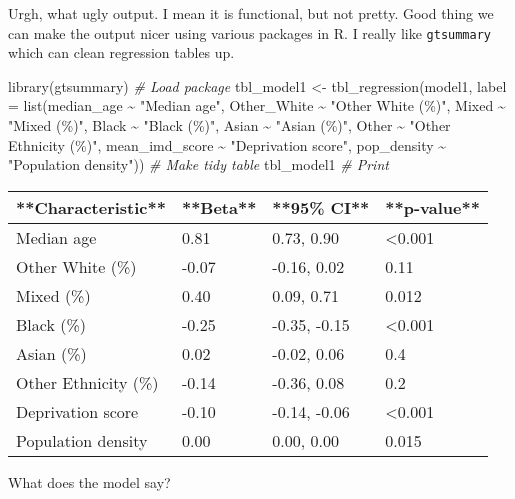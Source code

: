 \documentclass[
]{book}
\newenvironment{Shaded}{\begin{snugshade}}{\end{snugshade}}
\newcommand{\AttributeTok}[1]{\textcolor[rgb]{0.77,0.63,0.00}{#1}}
\newcommand{\CommentTok}[1]{\textcolor[rgb]{0.56,0.35,0.01}{\textit{#1}}}
\newcommand{\FunctionTok}[1]{\textcolor[rgb]{0.00,0.00,0.00}{#1}}
\newcommand{\NormalTok}[1]{#1}
\newcommand{\OtherTok}[1]{\textcolor[rgb]{0.56,0.35,0.01}{#1}}
\newcommand{\SpecialCharTok}[1]{\textcolor[rgb]{0.00,0.00,0.00}{#1}}
\newcommand{\StringTok}[1]{\textcolor[rgb]{0.31,0.60,0.02}{#1}}
\begin{document}
Urgh, what ugly output. I mean it is functional, but not pretty. Good thing we can make the output nicer using various packages in R. I really like \texttt{gtsummary} which can clean regression tables up.

\begin{Shaded}
\begin{Highlighting}[]
\FunctionTok{library}\NormalTok{(gtsummary) }\CommentTok{\# Load package}
\NormalTok{tbl\_model1 }\OtherTok{\textless{}{-}} \FunctionTok{tbl\_regression}\NormalTok{(model1, }\AttributeTok{label =} \FunctionTok{list}\NormalTok{(median\_age }\SpecialCharTok{\textasciitilde{}} \StringTok{"Median age"}\NormalTok{, Other\_White }\SpecialCharTok{\textasciitilde{}} \StringTok{"Other White (\%)"}\NormalTok{, Mixed }\SpecialCharTok{\textasciitilde{}} \StringTok{"Mixed (\%)"}\NormalTok{, Black }\SpecialCharTok{\textasciitilde{}} \StringTok{"Black (\%)"}\NormalTok{, Asian }\SpecialCharTok{\textasciitilde{}} \StringTok{"Asian (\%)"}\NormalTok{, Other }\SpecialCharTok{\textasciitilde{}} \StringTok{"Other Ethnicity (\%)"}\NormalTok{, mean\_imd\_score }\SpecialCharTok{\textasciitilde{}} \StringTok{"Deprivation score"}\NormalTok{, pop\_density }\SpecialCharTok{\textasciitilde{}} \StringTok{"Population density"}\NormalTok{)) }\CommentTok{\# Make tidy table}
\NormalTok{tbl\_model1 }\CommentTok{\# Print}
\end{Highlighting}
\end{Shaded}

\begin{tabular}{l|l|l|l}
\hline
**Characteristic** & **Beta** & **95\% CI** & **p-value**\\
\hline
Median age & 0.81 & 0.73, 0.90 & <0.001\\
\hline
Other White (\%) & -0.07 & -0.16, 0.02 & 0.11\\
\hline
Mixed (\%) & 0.40 & 0.09, 0.71 & 0.012\\
\hline
Black (\%) & -0.25 & -0.35, -0.15 & <0.001\\
\hline
Asian (\%) & 0.02 & -0.02, 0.06 & 0.4\\
\hline
Other Ethnicity (\%) & -0.14 & -0.36, 0.08 & 0.2\\
\hline
Deprivation score & -0.10 & -0.14, -0.06 & <0.001\\
\hline
Population density & 0.00 & 0.00, 0.00 & 0.015\\
\hline
\end{tabular}

What does the model say?
\end{document}
